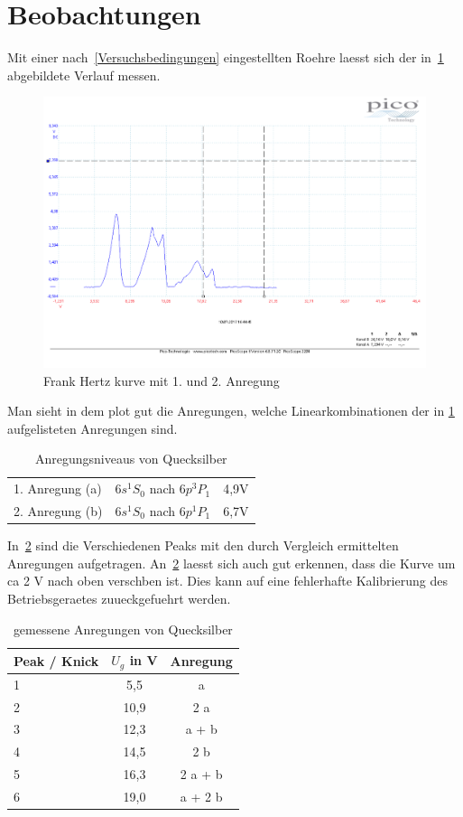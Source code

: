 \section{Beobachtungen}
Mit einer nach~\ref{Versuchsbedingungen} eingestellten Roehre laesst sich der in~\ref{fig:FrankHertz2} abgebildete Verlauf messen.
\begin{figure}
	\includegraphics[width=\textwidth]{../Daten/Frank_Hertz_2.pdf}
	\caption{Frank Hertz kurve mit 1. und 2. Anregung}
	\label{fig:FrankHertz2}
\end{figure}
Man sieht in dem plot gut die Anregungen, welche Linearkombinationen der in \ref{tab:hgAnr} aufgelisteten Anregungen sind.
\begin{table}
	\centering
	\caption{Anregungsniveaus von Quecksilber}
	\begin{tabular}{l | c c}
		\toprule
		1. Anregung (a) & $6s^1S_0$ nach $6p^3P_1$ & 4,9V\\
		2. Anregung (b)& $6s^1S_0$ nach $6p^1P_1$ & 6,7V\\
	\end{tabular}
	\label{tab:hgAnr}
\end{table}
In~\ref{tab:hgAnrgem} sind die Verschiedenen Peaks mit den durch Vergleich ermittelten Anregungen aufgetragen.
An~\ref{tab:hgAnrgem} laesst sich auch gut erkennen, dass die Kurve um ca 2 V nach oben verschben ist.
Dies kann auf eine fehlerhafte Kalibrierung des Betriebsgeraetes zuueckgefuehrt werden.
\begin{table}
	\centering
	\caption{gemessene Anregungen von Quecksilber}
	\begin{tabular}{l | c c}
		Peak / Knick & $U_g$ in V& Anregung\\
		\midrule
		1 & 5,5 & a \\
		2 & 10,9 & 2 a \\
		3 & 12,3 & a + b \\
		4 & 14,5 & 2 b \\
		5 & 16,3 & 2 a + b \\
		6 & 19,0 & a + 2 b \\
	\end{tabular}
	\label{tab:hgAnrgem}
\end{table}
